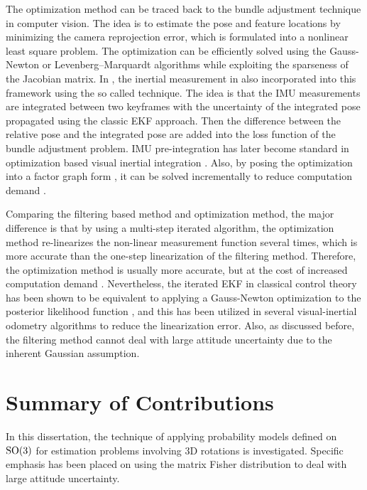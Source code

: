 The optimization method can be traced back to the bundle adjustment technique \cite{triggs1999bundle} in computer vision.
The idea is to estimate the pose and feature locations by minimizing the camera reprojection error, which is formulated into a nonlinear least square problem.
The optimization can be efficiently solved using the Gauss-Newton or Levenberg–Marquardt algorithms while exploiting the sparseness of the Jacobian matrix.
In \cite{forster2016manifold,lupton2011visual}, the inertial measurement in also incorporated into this framework using the so called  technique.
The idea is that the IMU measurements are integrated between two keyframes with the uncertainty of the integrated pose propagated using the classic EKF approach.
Then the difference between the relative pose and the integrated pose are added into the loss function of the bundle adjustment problem.
IMU pre-integration has later become standard in optimization based visual inertial integration \cite{brossard2021associating,mur2017visual,qin2018vins}.
Also, by posing the optimization into a factor graph form \cite{indelman2013information}, it can be solved incrementally to reduce computation demand \cite{kaess2012isam2}.

Comparing the filtering based method and optimization method, the major difference is that by using a multi-step iterated algorithm, the optimization method re-linearizes the non-linear measurement function several times, which is more accurate than the one-step linearization of the filtering method.
Therefore, the optimization method is usually more accurate, but at the cost of increased computation demand \cite{huang2019visual}.
Nevertheless, the iterated EKF in classical control theory has been shown to be equivalent to applying a Gauss-Newton optimization to the posterior likelihood function \cite{bell1993iterated}, and this has been utilized in several visual-inertial odometry algorithms \cite{bloesch2017iterated,bloesch2015robust} to reduce the linearization error.
Also, as discussed before, the filtering method cannot deal with large attitude uncertainty due to the inherent Gaussian assumption.

\section{Summary of Contributions}

In this dissertation, the technique of applying probability models defined on $\mathrm{SO}(3)$ for estimation problems involving 3D rotations is investigated.
Specific emphasis has been placed on using the matrix Fisher distribution to deal with large attitude uncertainty.

